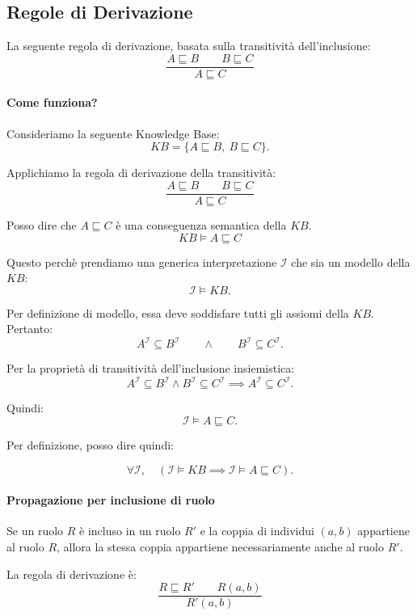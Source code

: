 \newpage

\subsection{Regole di Derivazione}
La seguente regola di derivazione, basata sulla transitività dell'inclusione:
\[
\frac{A\sqsubseteq B\qquad B\sqsubseteq C}
{A\sqsubseteq C}
\]
\paragraph{Come funziona?}
Consideriamo la seguente Knowledge Base:
\[
KB=\{A\sqsubseteq B,\ B\sqsubseteq C\}.
\]

Applichiamo la regola di derivazione della transitività:
\[
\frac{A\sqsubseteq B\qquad B\sqsubseteq C}
{A\sqsubseteq C}
\]

Posso dire che $A\sqsubseteq C$ è una conseguenza semantica della $KB$.
\[
KB \models A\sqsubseteq C
\]

Questo perchè prendiamo una generica interpretazione \(\mathcal I\) che sia un modello della \(KB\):
\[
\mathcal I\models KB.
\]

Per definizione di modello, essa deve soddisfare tutti gli assiomi della \(KB\). Pertanto:
\[
A^{\mathcal I}\subseteq B^{\mathcal I}
\qquad\land\qquad
B^{\mathcal I}\subseteq C^{\mathcal I}.
\]

Per la proprietà di transitività dell'inclusione insiemistica:
\[
A^{\mathcal I}\subseteq B^{\mathcal I}
\land
B^{\mathcal I}\subseteq C^{\mathcal I}
\implies
A^{\mathcal I}\subseteq C^{\mathcal I}.
\]

Quindi:
\[
\mathcal I\models A\sqsubseteq C.
\]

Per definizione, posso dire quindi:

\[
\forall\mathcal I,\quad
(\mathcal I\models KB
\implies
\mathcal I\models A\sqsubseteq C).
\]



\paragraph{Propagazione per inclusione di ruolo}

Se un ruolo $R$ è incluso in un ruolo $R'$ e la coppia
di individui $(a,b)$ appartiene al ruolo $R$, allora
la stessa coppia appartiene necessariamente anche al ruolo $R'$.

La regola di derivazione è:
\[
    \frac{R \sqsubseteq R' \qquad R(a,b)}
         {R'(a,b)}
\]

